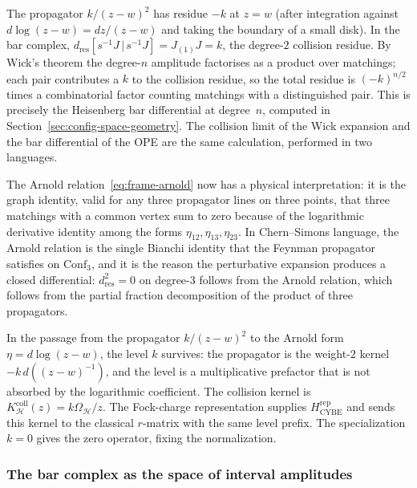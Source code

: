 \begin{remark}[Derivation]
The propagator $k/(z - w)^2$ has residue $-k$ at
$z = w$ (after integration against
$d\log(z - w) = dz/(z - w)$ and taking the boundary of a small
disk). In the bar complex,
$d_{\mathrm{res}}[s^{-1}J\,|\,s^{-1}J]
= J_{(1)}J = k$, the degree-$2$ collision residue. By Wick's
theorem the degree-$n$ amplitude factorises as a product over
matchings; each pair contributes a $k$ to the collision residue,
so the total residue is $(-k)^{n/2}$ times a combinatorial factor
counting matchings with a distinguished pair. This is
precisely the Heisenberg bar differential at degree~$n$, computed
in Section~\ref{sec:config-space-geometry}. The collision
limit of the Wick expansion and the bar differential of the
OPE are the same calculation, performed in two languages.
\end{remark}

The Arnold relation~\eqref{eq:frame-arnold} now has a physical
interpretation: it is the graph identity, valid for any three
propagator lines on three points, that three matchings with a
common vertex sum to zero because of the logarithmic derivative
identity among the forms $\eta_{12}, \eta_{13}, \eta_{23}$. In
Chern--Simons language, the Arnold relation is the single Bianchi
identity that the Feynman propagator satisfies on
$\mathrm{Conf}_3$, and it is the reason the perturbative expansion
produces a closed differential: $d_{\mathrm{res}}^2 = 0$ on
degree-$3$ follows from the Arnold relation, which follows from
the partial fraction decomposition of the product of three
propagators.

\begin{remark}
\label{rem:cs-hinge-trace-form}
In the passage from the propagator $k/(z - w)^2$ to the Arnold
form $\eta = d\log(z - w)$, the level $k$ survives: the
propagator is the weight-$2$ kernel
$-k\,d((z-w)^{-1})$, and the level is a multiplicative prefactor
that is not absorbed by the logarithmic coefficient.
The collision kernel is
$K_{\mathcal H}^{\mathrm{coll}}(z)=k\Omega_{\mathcal H}/z$.
The Fock-charge representation supplies
$H_{\mathrm{CYBE}}^{\mathrm{rep}}$ and sends this kernel to the
classical $r$-matrix with the same level prefix.  The specialization
$k=0$ gives the zero operator, fixing the normalization.
\end{remark}

\subsubsection{The bar complex as the space of interval amplitudes}
\label{sec:cs-hinge-bar-interval}

